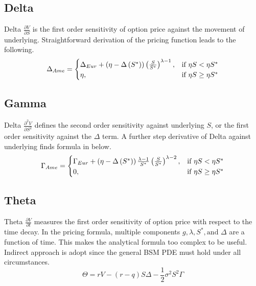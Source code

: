 \documentclass{article}
\begin{document}
\subsection{Delta}
Delta $ \frac{\partial V}{\partial S} $ is the first order sensitivity of option price against the movement of underlying.
Straightforward derivation of the pricing function leads to the following.
\begin{equation}
    \Delta_{Ame} =
    \begin{cases}
        \Delta_{Eur} + \left(\eta - \Delta\left(S^*\right)\right) \left(\frac{S}{S^*}\right)^{\lambda - 1} , & \mbox{if $ \eta S < \eta S^* $} \\
        \eta, & \mbox{if $ \eta S \geq \eta S^* $} 
    \end{cases}
\end{equation}

\subsection{Gamma}
Delta $ \frac{\partial^2 V}{\partial S^2} $ defines the second order sensitivity against underlying $ S $, or the first order sensitivity against the $ \Delta $ term.
A further step derivative of Delta against underlying finds formula in below.
\begin{equation}
    \Gamma_{Ame} = 
    \begin{cases}
        \Gamma_{Eur} + \left(\eta - \Delta\left(S^*\right)\right) \frac{\lambda - 1}{S^*} \left(\frac{S}{S^*}\right)^{\lambda - 2}, & \mbox{if $ \eta S < \eta S^* $} \\
        0, & \mbox{if $ \eta S \geq \eta S^* $} 
    \end{cases}
\end{equation}

\subsection{Theta}
Theta $ \frac{\partial V}{\partial t} $ measures the first order sensitivity of option price with respect to the time decay.
In the pricing formula, multiple components $ g, \lambda, S^*, \text{and } \Delta $ are a function of time.
This makes the analytical formula too complex to be useful.
Indirect approach is adopt since the general BSM PDE must hold under all circumstances.
\begin{equation}
    \Theta = r V - \left(r - q\right) S \Delta - \frac{1}{2} \sigma^2 S^2 \Gamma
\end{equation}
\end{document}
